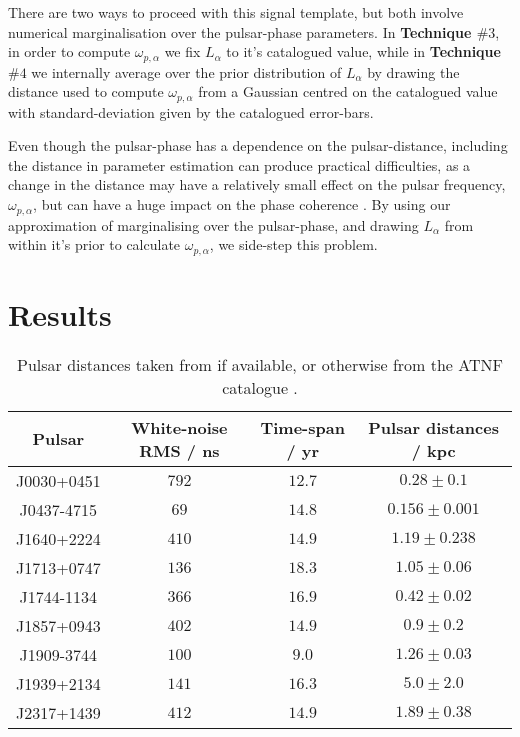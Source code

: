 \documentclass[prd,showpacs,nofootinbib]{revtex4}
\begin{document}
There are two ways to proceed with this signal template, but both involve numerical marginalisation over the pulsar-phase parameters. In {\bf Technique $\#3$}, in order to compute $\omega_{p,\alpha}$ we fix $L_{\alpha}$ to it's catalogued value, while in {\bf Technique $\#4$} we internally average over the prior distribution of $L_{\alpha}$ by drawing the distance used to compute $\omega_{p,\alpha}$ from a Gaussian centred on the catalogued value with standard-deviation given by the catalogued error-bars.

Even though the pulsar-phase has a dependence on the pulsar-distance, including the distance in parameter estimation can produce practical difficulties, as a change in the distance may have a relatively small effect on the pulsar frequency, $\omega_{p,\alpha}$, but can have a huge impact on the phase coherence \citep{ellis-pipeline}. By using our approximation of marginalising over the pulsar-phase, and drawing $L_{\alpha}$ from within it's prior to calculate $\omega_{p,\alpha}$, we side-step this problem.

\section{Results}

\begin{table}
\caption{\label{tab:9PsrInfo}Pulsar distances taken from \citet{verbiest-psr-distances} if available, or otherwise from the ATNF catalogue \citep{ATNF-cat}.}
\begin{ruledtabular}
\begin{tabular}{c c c c}
Pulsar & White-noise RMS / ns & Time-span / yr & Pulsar distances / kpc\\
\hline
J0030+0451 & $792$ & $12.7$ & $0.28\pm0.1$ \\
J0437-4715 & $69$ & $14.8$ & $0.156\pm0.001$ \\
J1640+2224 & $410$ & $14.9$ & $1.19\pm0.238$ \\
J1713+0747 & $136$ & $18.3$ & $1.05\pm0.06$ \\
J1744-1134 & $366$ & $16.9$ & $0.42\pm0.02$ \\
J1857+0943 & $402$ & $14.9$ & $0.9\pm0.2$ \\
J1909-3744 & $100$ & $9.0$ & $1.26\pm0.03$ \\
J1939+2134 & $141$ & $16.3$ & $5.0\pm2.0$ \\
J2317+1439 & $412$ & $14.9$ & $1.89\pm0.38$ \\
\end{tabular}
\end{ruledtabular}
\end{table}
\end{document}

